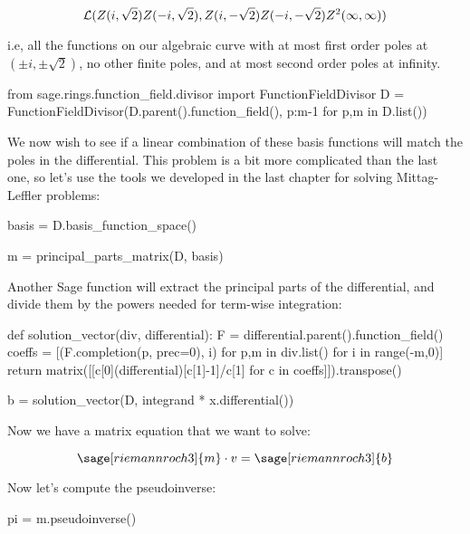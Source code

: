 $${\cal L}(Z(i, \sqrt{2}) Z(-i, \sqrt{2}), Z(i, -\sqrt{2}) Z(-i, -\sqrt{2}) Z^2(\infty,\infty))$$

i.e, all the functions on our algebraic curve with at most first order
poles at $(\pm i,\pm\sqrt{2})$, no other finite poles, and at most
second order poles at infinity.

\begin{sageblock}[riemannroch3]
from sage.rings.function_field.divisor import FunctionFieldDivisor
D = FunctionFieldDivisor(D.parent().function_field(), {p:m-1 for p,m in D.list()})
\end{sageblock}

We now wish to see if a linear combination of these basis functions will
match the poles in the differential.  This problem is a bit more complicated
than the last one, so let's use the tools we developed in the
last chapter for solving Mittag-Leffler problems:

\begin{sageblock}[riemannroch3]
basis = D.basis_function_space()
\end{sageblock}

\begin{sageblock}[riemannroch3]
m = principal_parts_matrix(D, basis)
\end{sageblock}

Another Sage function will extract the principal parts of the
differential, and divide them by the powers needed for term-wise
integration:

\begin{sageblock}[riemannroch3]
def solution_vector(div, differential):
    F = differential.parent().function_field()
    coeffs = [(F.completion(p, prec=0), i) for p,m in div.list() for i in range(-m,0)]
    return matrix([[c[0](differential)[c[1]-1]/c[1] for c in coeffs]]).transpose()
\end{sageblock}

\begin{sageblock}[riemannroch3]
b = solution_vector(D, integrand * x.differential())
\end{sageblock}

Now we have a matrix equation that we want to solve:

$$\sage[riemannroch3]{m} \cdot v = \sage[riemannroch3]{b}$$

Now let's compute the pseudoinverse:

\begin{sageblock}[riemannroch3]
pi = m.pseudoinverse()
\end{sageblock}

